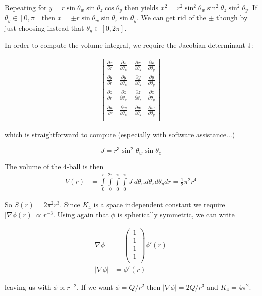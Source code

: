 \documentclass[12pt]{article}
\begin{document}
Repeating for \(y = r\sin\theta_w\sin\theta_z\cos\theta_y \) then yields \(x^2 = r^2\sin^2\theta_w\sin^2\theta_z\sin^2\theta_y\). If \(\theta_y \in [0,\pi]\) then \(x = \pm r\sin\theta_w\sin\theta_z\sin\theta_y \). We can get rid of the \(\pm\) though by just choosing instead that \(\theta_y \in [0,2\pi]\).

In order to compute the volume integral, we require the Jacobian determinant J:

\begin{align*}
	\left|\begin{matrix}
	\frac{\partial x}{\partial r} & \frac{\partial x}{\partial \theta_w} & \frac{\partial x}{\partial \theta_z} &\frac{\partial x}{\partial \theta_y} \\[6pt]
	\frac{\partial y}{\partial r} & \frac{\partial y}{\partial \theta_w} & \frac{\partial y}{\partial \theta_z} &\frac{\partial y}{\partial \theta_y} \\[6pt]
	\frac{\partial z}{\partial r} & \frac{\partial z}{\partial \theta_w} & \frac{\partial z}{\partial \theta_z} &\frac{\partial z}{\partial \theta_y} \\[6pt]
	\frac{\partial w}{\partial r} & \frac{\partial w}{\partial \theta_w} & \frac{\partial w}{\partial \theta_z} &\frac{\partial w}{\partial \theta_y} \\
	\end{matrix}\right|
\end{align*}

which is straightforward to compute (especially with software assistance...)

\[J=r^3\sin^2\theta_w\sin\theta_z
\]

The volume of the 4-ball is then
\begin{align*}
V(r) &= \int\limits_{0}^{r}\int\limits_{0}^{2\pi}\int\limits_{0}^{\pi}\int\limits_{0}^{\pi}J\ d\theta_w d\theta_z d\theta_y dr = \frac{1}{2}\pi^2r^4
\end{align*}

So \(S(r) = 2\pi^2r^3 \). Since \(K_4\) is a space independent constant we require \(|\nabla \phi(r)| \propto r^{-3}\). Using again that \(\phi\) is spherically symmetric, we can write

\begin{align*} 
\nabla\phi &= \left(\begin{matrix}
1 \\ 1\\ 1 \\ 1\\
\end{matrix}\right)\phi ' (r) \\[6pt]
|\nabla\phi| &= \phi ' (r)
\end{align*} 

leaving us with \(\phi \propto r^{-2}\). If we want \(\phi = Q/r^2 \) then \(|\nabla \phi| = 2Q/r^3\) and \(K_4 = 4\pi^2\). 
\end{document}

